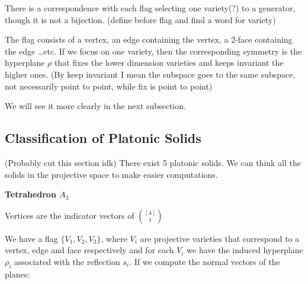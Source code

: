 \documentclass[leqno]{article}
\numberwithin{equation}{section}
\numberwithin{theorem}{section}
\begin{document}
\begin{center}
\end{center}

There is a correspondence with each flag selecting one variety(?) to a generator, though it is not a bijection. (define before flag and find a word for variety)

The flag consists of a vertex, an edge containing the vertex, a 2-face containing the edge \ldots etc. If we focus on one variety, then the corresponding symmetry is the hyperplane $\rho $ that fixes the lower dimension varieties and keeps invariant the higher ones. (By keep invariant I mean the subspace goes to the same subspace, not necessarily point to point, while fix is point to point)

We will see it more clearly in the next subsection.

\subsection{Classification of Platonic Solids} (Probably cut this section idk)
There exist 5 platonic solids. We can think all the solids in the projective space to make easier computations.

\textbf{Tetrahedron $A_3$}

Vertices are the indicator vectors of $\binom{[4]}{1}$

We have a flag $\{V_1, V_2, V_3\}$, where $V_i$ are projective varieties that correspond to a vertex, edge and face respectively and for each  $V_i$ we have the induced hyperplane $\rho_i $ associated with the reflection $s_i$. If we compute the normal vectors of the planes:
\end{document}
